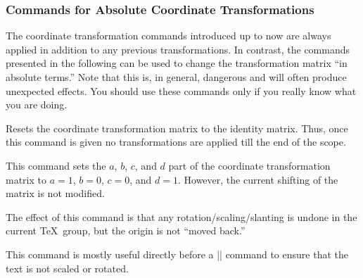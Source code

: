 \subsubsection{Commands for Absolute Coordinate Transformations}

The coordinate transformation commands introduced up to now are always
applied in addition to any previous transformations. In contrast, the
commands presented in the following can be used to change the
transformation matrix ``in absolute terms.'' Note that this is, in general,
dangerous and will often produce unexpected effects. You should use
these commands only if you really know what you are doing.

\begin{command}{\pgftransformreset}
  Resets the coordinate transformation matrix to the identity
  matrix. Thus, once this command is given no transformations are
  applied till the end of the scope.
\begin{codeexample}[]
\end{codeexample}
\end{command}


\begin{command}{\pgftransformresetnontranslations}
  This command sets the $a$, $b$, $c$, and $d$ part of the coordinate
  transformation matrix to $a=1$, $b=0$, $c=0$, and $d=1$. However,
  the current shifting of the matrix is not modified.

  The effect of this command is that any rotation/scaling/slanting is
  undone in the current \TeX\ group, but the origin is not ``moved
  back.''

  This command is mostly useful directly before a |\pgftext| command
  to ensure that the text is not scaled or rotated.
\begin{codeexample}[]
\end{codeexample}
\end{command}


